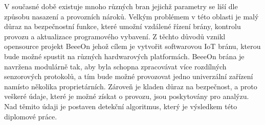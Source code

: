  V současné době existuje mnoho různých bran jejichž parametry se liší dle 
 způsobu nasazení a provozních nároků. Velkým problémem v této oblasti je malý 
 důraz na bezpečnostní funkce, které umožní vzdálené řízení brány, kontrolu provozu a 
 aktualizace programového vybavení. Z těchto důvodů vznikl opensource projekt BeeeOn \cite{beeeon}
 jehož cílem je vytvořit softwarovou IoT bránu, kterou bude možné spustit na různých 
 hardwarových platformách. BeeeOn brána je navržena modulárně tak, aby byla schopna 
 zpracovávat více rozdílných senzorových protokolů, a tím bude možné provozovat jedno
 univerzální zařízení namísto několika proprietárních. Zároveň je kladen důraz na bezpečnost, 
 a proto veškeré údaje, které je možné získat o provozu, jsou poskytovány pro analýzu. Nad těmito údaji
 je postaven detekční algoritmus, který je výsledkem této diplomové práce.
 

